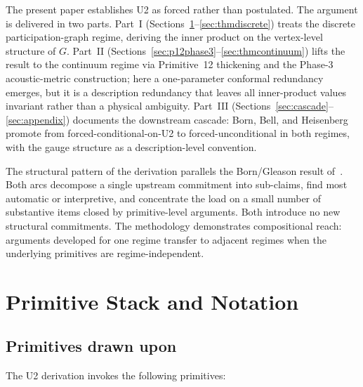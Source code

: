 \documentclass[11pt,a4paper]{article}
\begin{document}
The present paper establishes U2 as forced rather than postulated. The argument is delivered in two parts. Part~I (Sections~\ref{sec:primitives}--\ref{sec:thmdiscrete}) treats the discrete participation-graph regime, deriving the inner product on the vertex-level structure of $G$. Part~II (Sections~\ref{sec:p12phase3}--\ref{sec:thmcontinuum}) lifts the result to the continuum regime via Primitive~12 thickening and the Phase-3 acoustic-metric construction; here a one-parameter conformal redundancy emerges, but it is a description redundancy that leaves all inner-product values invariant rather than a physical ambiguity. Part~III (Sections~\ref{sec:cascade}--\ref{sec:appendix}) documents the downstream cascade: Born, Bell, and Heisenberg promote from forced-conditional-on-U2 to forced-unconditional in both regimes, with the gauge structure as a description-level convention.

The structural pattern of the derivation parallels the Born/Gleason result of~\cite{borngleason}. Both arcs decompose a single upstream commitment into sub-claims, find most automatic or interpretive, and concentrate the load on a small number of substantive items closed by primitive-level arguments. Both introduce no new structural commitments. The methodology demonstrates compositional reach: arguments developed for one regime transfer to adjacent regimes when the underlying primitives are regime-independent.

\section{Primitive Stack and Notation}\label{sec:primitives}

\subsection{Primitives drawn upon}

The U2 derivation invokes the following primitives:
\end{document}
